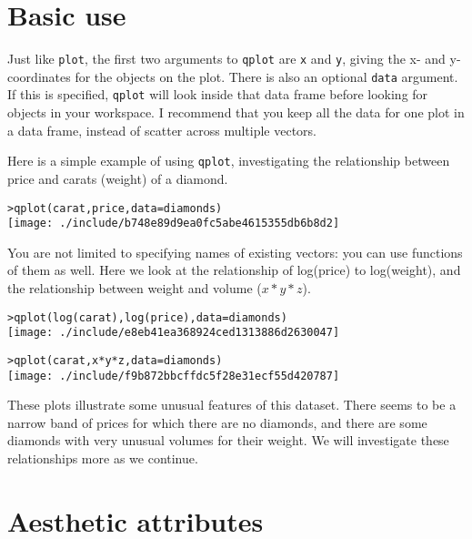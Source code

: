 \section{Basic use}\label{sec:basic_use}

Just like {\tt plot}, the first two arguments to {\tt qplot} are {\tt x} and {\tt y}, giving the x- and y-coordinates for the objects on the plot. There is also an optional {\tt data} argument.  If this is specified, {\tt qplot} will look inside that data frame before looking for objects in your workspace.  I recommend that you keep all the data for one plot in a data frame, instead of scatter across multiple vectors.

Here is a simple example of using {\tt qplot}, investigating the relationship between price and carats (weight) of a diamond.  

\begin{alltt}
> qplot(carat, price, data = diamonds)
\texttt{[image: ./include/b748e89d9ea0fc5abe4615355db6b8d2]}

\end{alltt}

You are not limited to specifying names of existing vectors: you can use functions of them as well.  Here we look at the relationship of log(price) to log(weight), and the relationship between weight and volume ($x * y * z$).

\begin{alltt}
> qplot(log(carat), log(price), data = diamonds)
\texttt{[image: ./include/e8eb41ea368924ced1313886d2630047]}

> qplot(carat, x * y * z, data = diamonds)
\texttt{[image: ./include/f9b872bbcffdc5f28e31ecf55d420787]}

\end{alltt}

These plots illustrate some unusual features of this dataset.  There seems to be a narrow band of prices for which there are no diamonds, and there are some diamonds with very unusual volumes for their weight.  We will investigate these relationships more as we continue.

\section{Aesthetic attributes}\label{sec:aesthetic_attributes}


